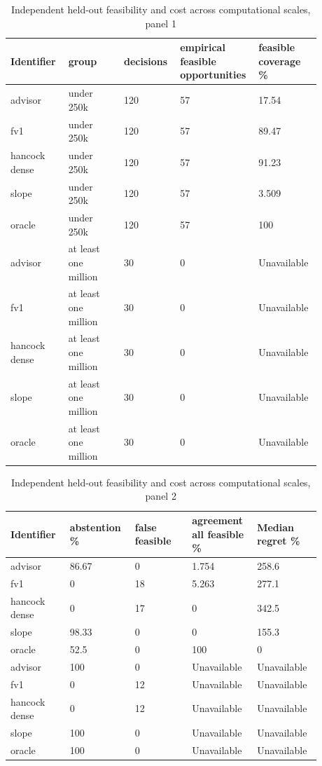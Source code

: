 \begingroup
\small
\setlength{\tabcolsep}{2pt}
\begin{longtable}{p{0.1760\linewidth}p{0.1760\linewidth}p{0.1760\linewidth}p{0.1760\linewidth}p{0.1760\linewidth}}
\caption{Independent held-out feasibility and cost across computational scales, panel 1}\\
\hline
Identifier & group & decisions & empirical feasible opportunities & feasible coverage \% \\
\hline\endhead
advisor & under 250k & 120 & 57 & 17.54 \\
fv1 & under 250k & 120 & 57 & 89.47 \\
hancock dense & under 250k & 120 & 57 & 91.23 \\
slope & under 250k & 120 & 57 & 3.509 \\
oracle & under 250k & 120 & 57 & 100 \\
advisor & at least one million & 30 & 0 & Unavailable \\
fv1 & at least one million & 30 & 0 & Unavailable \\
hancock dense & at least one million & 30 & 0 & Unavailable \\
slope & at least one million & 30 & 0 & Unavailable \\
oracle & at least one million & 30 & 0 & Unavailable \\
\end{longtable}
\begin{longtable}{p{0.1760\linewidth}p{0.1760\linewidth}p{0.1760\linewidth}p{0.1760\linewidth}p{0.1760\linewidth}}
\caption{Independent held-out feasibility and cost across computational scales, panel 2}\\
\hline
Identifier & abstention \% & false feasible & agreement all feasible \% & Median regret \% \\
\hline\endhead
advisor & 86.67 & 0 & 1.754 & 258.6 \\
fv1 & 0 & 18 & 5.263 & 277.1 \\
hancock dense & 0 & 17 & 0 & 342.5 \\
slope & 98.33 & 0 & 0 & 155.3 \\
oracle & 52.5 & 0 & 100 & 0 \\
advisor & 100 & 0 & Unavailable & Unavailable \\
fv1 & 0 & 12 & Unavailable & Unavailable \\
hancock dense & 0 & 12 & Unavailable & Unavailable \\
slope & 100 & 0 & Unavailable & Unavailable \\
oracle & 100 & 0 & Unavailable & Unavailable \\
\end{longtable}
